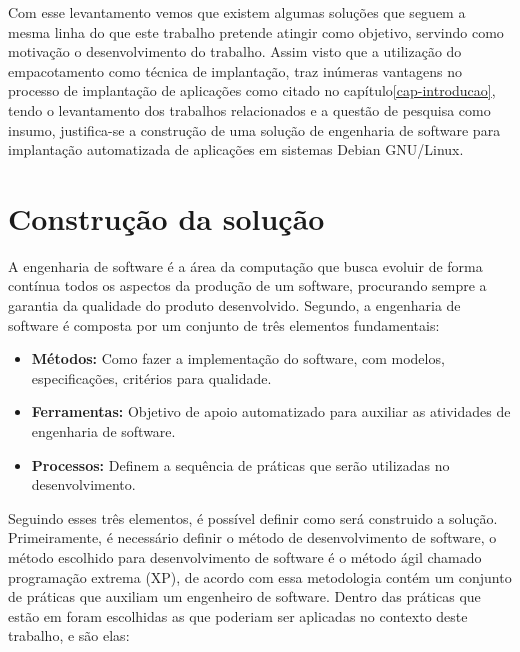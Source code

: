 Com esse levantamento vemos que existem algumas soluções  que seguem a mesma
linha do que este trabalho pretende atingir como objetivo, servindo como motivação
o desenvolvimento do trabalho. Assim visto que a utilização do empacotamento
como técnica de implantação, traz inúmeras vantagens no processo de implantação
de aplicações como citado no capítulo\ref{cap-introducao}, tendo o levantamento
dos trabalhos relacionados e a questão de pesquisa como insumo, justifica-se a
construção de uma solução de engenharia de software para implantação automatizada
de aplicações  em sistemas Debian GNU/Linux.

\section{Construção da solução}
\label{section:construcao}

A engenharia de software é a área da computação que busca evoluir de forma contínua
todos os aspectos da produção de um software, procurando sempre a garantia da
qualidade do produto desenvolvido. Segundo\cite{pressman2011engenharia}, a engenharia
de software é  composta por um conjunto de três elementos fundamentais:

\begin{itemize}
  \item \textbf{Métodos:} Como fazer a implementação do software, com modelos,
  especificações, critérios para qualidade.
  \item \textbf{Ferramentas:} Objetivo de apoio automatizado para auxiliar as atividades
  de engenharia de software.
  \item \textbf{Processos:} Definem a sequência de práticas que serão utilizadas no
  desenvolvimento.
\end{itemize}

Seguindo esses três elementos, é possível definir como será construido a solução.
Primeiramente, é necessário definir o método de desenvolvimento de software, o
método escolhido para desenvolvimento de software é o método ágil chamado programação
extrema (XP), de acordo com\cite{796139} essa metodologia contém um conjunto de
práticas que auxiliam um engenheiro de software. Dentro das práticas que estão
em\cite{796139} foram escolhidas as que poderiam ser aplicadas no contexto deste
 trabalho, e são elas:

